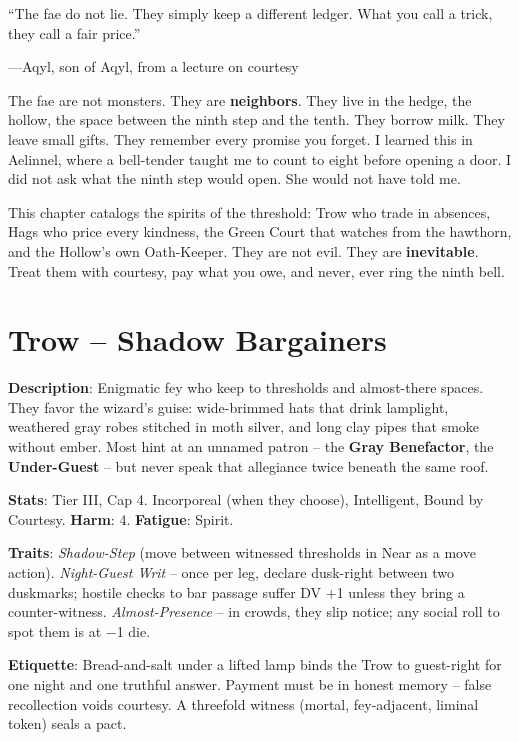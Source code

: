 
\epigraph{``The fae do not lie. They simply keep a different ledger. What you call a trick, they call a fair price.''}{---Aqyl, son of Aqyl, from a lecture on courtesy}

The fae are not monsters. They are \textbf{neighbors}. They live in the hedge, the hollow, the space between the ninth step and the tenth. They borrow milk. They leave small gifts. They remember every promise you forget. I learned this in Aelinnel, where a bell-tender taught me to count to eight before opening a door. I did not ask what the ninth step would open. She would not have told me.

This chapter catalogs the spirits of the threshold: Trow who trade in absences, Hags who price every kindness, the Green Court that watches from the hawthorn, and the Hollow's own Oath-Keeper. They are not evil. They are \textbf{inevitable}. Treat them with courtesy, pay what you owe, and never, ever ring the ninth bell.

\section*{Trow -- Shadow Bargainers}

\noindent\textbf{Description}: Enigmatic fey who keep to thresholds and almost-there spaces.  
They favor the wizard's guise: wide-brimmed hats that drink lamplight, weathered gray robes stitched in moth silver, and long clay pipes that smoke without ember. Most hint at an unnamed patron -- the \textbf{Gray Benefactor}, the \textbf{Under-Guest} -- but never speak that allegiance twice beneath the same roof.

\noindent\textbf{Stats}: Tier III, Cap 4. Incorporeal (when they choose), Intelligent, Bound by Courtesy.  
\textbf{Harm}: 4. \textbf{Fatigue}: Spirit.

\noindent\textbf{Traits}: 
\emph{Shadow-Step} (move between witnessed thresholds in Near as a move action).  
\emph{Night-Guest Writ} -- once per leg, declare dusk-right between two duskmarks; hostile checks to bar passage suffer DV +1 unless they bring a counter-witness.  
\emph{Almost-Presence} -- in crowds, they slip notice; any social roll to spot them is at −1 die.

\noindent\textbf{Etiquette}: Bread-and-salt under a lifted lamp binds the Trow to guest-right for one night and one truthful answer. Payment must be in honest memory -- false recollection voids courtesy. A threefold witness (mortal, fey-adjacent, liminal token) seals a pact.

